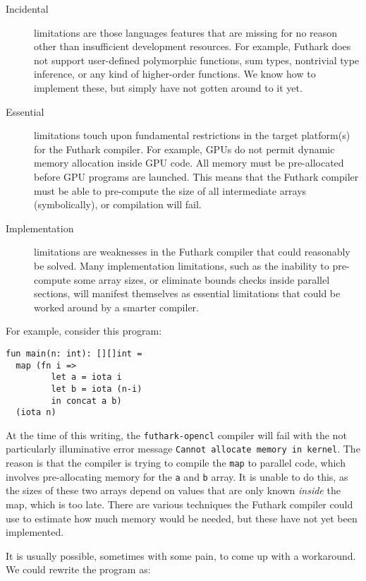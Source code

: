 \documentclass[11pt]{book}
\begin{document}
\begin{description}
\item[Incidental] limitations are those languages features that are
  missing for no reason other than insufficient development resources.
  For example, Futhark does not support user-defined polymorphic
  functions, sum types, nontrivial type inference, or any kind of
  higher-order functions.  We know how to implement these, but simply
  have not gotten around to it yet.

\item[Essential] limitations touch upon fundamental restrictions in
  the target platform(s) for the Futhark compiler.  For example, GPUs
  do not permit dynamic memory allocation inside GPU code.  All memory
  must be pre-allocated before GPU programs are launched.  This means
  that the Futhark compiler must be able to pre-compute the size of
  all intermediate arrays (symbolically), or compilation will fail.

\item[Implementation] limitations are weaknesses in the Futhark
  compiler that could reasonably be solved.  Many implementation
  limitations, such as the inability to pre-compute some array sizes,
  or eliminate bounds checks inside parallel sections, will manifest
  themselves as essential limitations that could be worked around by a
  smarter compiler.
\end{description}

For example, consider this program:

\begin{lstlisting}
fun main(n: int): [][]int =
  map (fn i =>
         let a = iota i
         let b = iota (n-i)
         in concat a b)
  (iota n)
\end{lstlisting}

At the time of this writing, the \texttt{futhark-opencl} compiler will
fail with the not particularly illuminative error message
\texttt{Cannot allocate memory in kernel}.  The reason is that the
compiler is trying to compile the \texttt{map} to parallel code, which
involves pre-allocating memory for the \texttt{a} and \texttt{b}
array.  It is unable to do this, as the sizes of these two arrays
depend on values that are only known \textit{inside} the map, which is
too late.  There are various techniques the Futhark compiler could use
to estimate how much memory would be needed, but these have not yet
been implemented.

It is usually possible, sometimes with some pain, to come up with a
workaround.  We could rewrite the program as:
\end{document}
